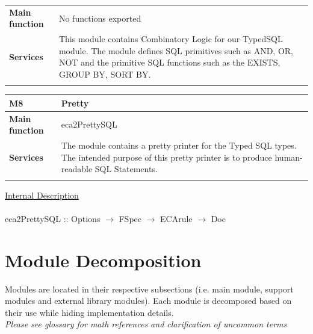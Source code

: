 \documentclass[12pt]{article}
\begin{document}
{{{{{{{\begin{tabularx}{\textwidth}{>{\bfseries}m{5cm}X}
        Main function  & No functions exported
        \\	Services &  This module contains Combinatory Logic for our TypedSQL module. The module defines SQL primitives such as AND, OR, NOT and the primitive SQL functions such as the EXISTS, GROUP BY, SORT BY.
        \\       
        \vspace{12pt}
    \end{tabularx}\vspace{3em}
    {\setlength{\tabcolsep}{6pt} 
        \begin{tabularx}{\textwidth}{>{\bfseries}m{5cm}X}
            M8 & Pretty \\ 
            \midrule
            
            Main function  & eca2PrettySQL
            \\	Services &  The module contains a pretty printer for the Typed SQL types. The intended purpose of this pretty printer is to produce human-readable SQL Statements.
            \\       
            \vspace{12pt}
        \end{tabularx}\vspace{3em}
\underline{Internal Description}\\ \\
eca2PrettySQL :: Options $\rightarrow$ FSpec $\rightarrow$ ECArule $\rightarrow$ Doc

\section{Module Decomposition} \label{SecMD}
Modules are located in their respective subsections (i.e. main module, support 
modules and external library modules). Each module is decomposed based on their 
use while hiding implementation details. 
\\ \newline
\textit{Please see glossary for math references and clarification of uncommon 
terms}

        
}}}}}}}}
\end{document}
